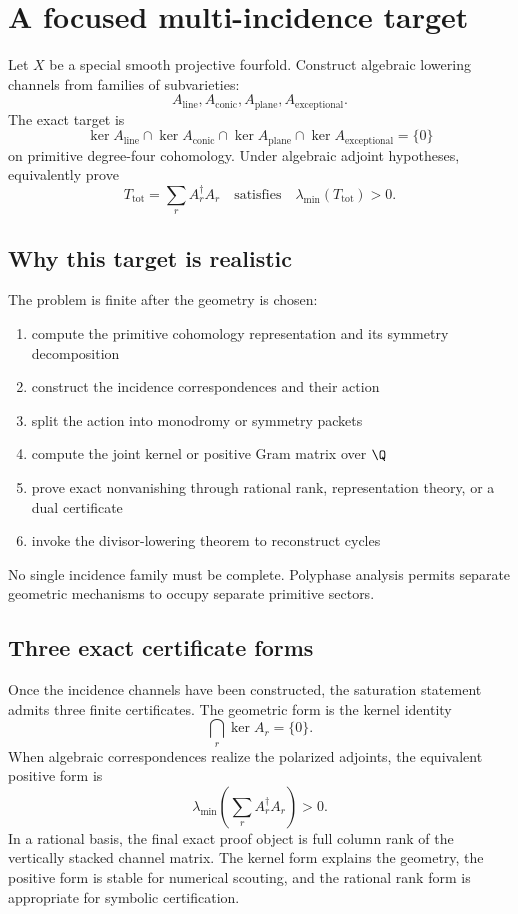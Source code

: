 


\chapter{A focused multi-incidence target}
Let $X$ be a special smooth projective fourfold. Construct algebraic lowering channels from families of subvarieties:
\[
A_{\mathrm{line}},
A_{\mathrm{conic}},
A_{\mathrm{plane}},
A_{\mathrm{exceptional}}.
\]
The exact target is
\[
\ker A_{\mathrm{line}}
\cap\ker A_{\mathrm{conic}}
\cap\ker A_{\mathrm{plane}}
\cap\ker A_{\mathrm{exceptional}}=\{0\}
\]
on primitive degree-four cohomology. Under algebraic adjoint hypotheses, equivalently prove
\[
T_{\mathrm{tot}}
=\sum_rA_r^\dagger A_r
\quad\text{satisfies}\quad
\lambda_{\min}(T_{\mathrm{tot}})>0.
\]



\section{Why this target is realistic}
The problem is finite after the geometry is chosen:
\begin{enumerate}
\item compute the primitive cohomology representation and its symmetry decomposition
\item construct the incidence correspondences and their action
\item split the action into monodromy or symmetry packets
\item compute the joint kernel or positive Gram matrix over $\Q$
\item prove exact nonvanishing through rational rank, representation theory, or a dual certificate
\item invoke the divisor-lowering theorem to reconstruct cycles
\end{enumerate}
No single incidence family must be complete. Polyphase analysis permits separate geometric mechanisms to occupy separate primitive sectors.


\section{Three exact certificate forms}
Once the incidence channels have been constructed, the saturation statement admits three finite certificates. The geometric form is the kernel identity
\[
\bigcap_r\ker A_r=\{0\}.
\]
When algebraic correspondences realize the polarized adjoints, the equivalent positive form is
\[
\lambda_{\min}\left(\sum_rA_r^\dagger A_r\right)>0.
\]
In a rational basis, the final exact proof object is full column rank of the vertically stacked channel matrix. The kernel form explains the geometry, the positive form is stable for numerical scouting, and the rational rank form is appropriate for symbolic certification.

